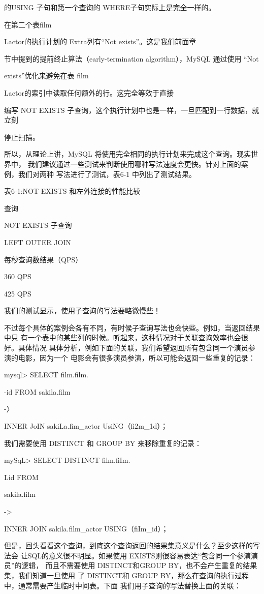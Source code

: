 的USING 子句和第一个查询的 WHERE子句实际上是完全一样的。

在第二个表film

Lactor的执行计划的 Extra列有“Not exists”。这是我们前面章

节中提到的提前终止算法（early-termination algorithm），MySQL 通过使用 “Not

exists”优化来避免在表 film

Lactor的索引中读取任何额外的行。这完全等效于直接

编写 NOT EXISTS 子查询，这个执行计划中也是一样，一旦匹配到一行数据，就立刻

停止扫描。

所以，从理论上讲，MySQL 将使用完全相同的执行计划来完成这个查询。现实世界中，
我们建议通过一些测试来判断使用哪种写法速度会更快。针对上面的案例，我们对两种
写法进行了测试，表6-1 中列出了测试结果。

表6-1:NOT EXISTS 和左外连接的性能比较

查询

NOT EXISTS 子查询

LEFT OUTER JOIN

每秒查询数结果（QPS）

360 QPS

425 QPS

我们的测试显示，使用子查询的写法要略微慢些！

不过每个具体的案例会各有不同，有时候子查询写法也会快些。例如，当返回结果中只
有一个表中的某些列的时候。听起来，这种情况对于关联查询效率也会很好。具体情况
具体分析，例如下面的关联，我们希望返回所有包含同一个演员参演的电影，因为一个
电影会有很多演员参演，所以可能会返回一些重复的记录：

mysql> SELECT film.film.

-id FROM sakila.film

-〉

INNER JoIN sakiLa.fim\_actor UsiNG（fi2m\_1d）；

我们需要使用 DISTINCT 和 GROUP BY 来移除重复的记录：

mySqL> SELECT DISTINCT film.fiIm.

Lid FROM

sakila.film

->

INNER JOIN sakila.film\_actor USING（fiIm\_id）；

但是，回头看看这个查询，到底这个查询返回的结果集意义是什么？至少这样的写法会
让SQL的意义很不明显。如果使用 EXISTS则很容易表达“包含同一个参演演员”的逻辑，
而且不需要使用 DISTINCT和GROUP BY，也不会产生重复的结果集，我们知道一旦使用
了 DISTINCT和 GROUP BY，那么在查询的执行过程中，通常需要产生临时中间表。下面
我们用子查询的写法替换上面的关联：

